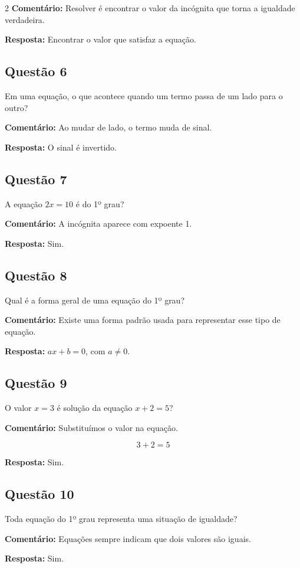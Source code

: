 \documentclass[11pt]{article}
\begin{document}
\begin{multicols}{2}
\textbf{Comentário:}  
Resolver é encontrar o valor da incógnita que torna a igualdade verdadeira.

\textbf{Resposta:} Encontrar o valor que satisfaz a equação.

\subsection*{Questão 6}
Em uma equação, o que acontece quando um termo passa de um lado para o outro?

\textbf{Comentário:}  
Ao mudar de lado, o termo muda de sinal.

\textbf{Resposta:} O sinal é invertido.

\subsection*{Questão 7}
A equação $2x = 10$ é do 1º grau?

\textbf{Comentário:}  
A incógnita aparece com expoente 1.

\textbf{Resposta:} Sim.

\subsection*{Questão 8}
Qual é a forma geral de uma equação do 1º grau?

\textbf{Comentário:}  
Existe uma forma padrão usada para representar esse tipo de equação.

\textbf{Resposta:} $ax + b = 0$, com $a \neq 0$.

\subsection*{Questão 9}
O valor $x = 3$ é solução da equação $x + 2 = 5$?

\textbf{Comentário:}  
Substituímos o valor na equação.

\[
3 + 2 = 5
\]

\textbf{Resposta:} Sim.

\subsection*{Questão 10}
Toda equação do 1º grau representa uma situação de igualdade?

\textbf{Comentário:}  
Equações sempre indicam que dois valores são iguais.

\textbf{Resposta:} Sim.


\end{multicols}
\end{document}
